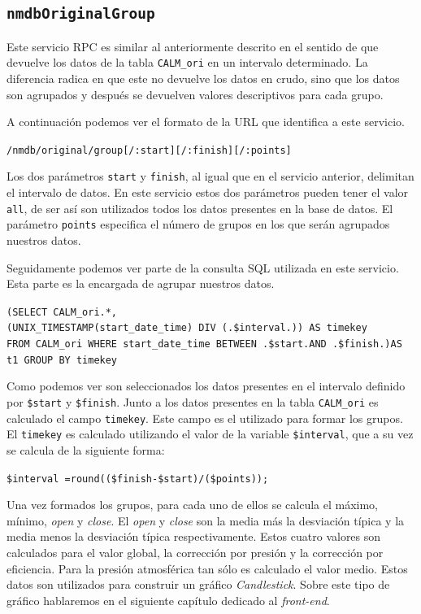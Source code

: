 	\subsection{\texttt{nmdbOriginalGroup}}
		Este servicio RPC es similar al anteriormente descrito en el sentido de que devuelve los datos de la tabla \texttt{CALM\_ori} en un
		intervalo determinado. La diferencia radica en que este no devuelve los datos en crudo, sino que los datos son agrupados y después se
		devuelven valores descriptivos para cada grupo.
		\par
		A continuación podemos ver el formato de la URL que identifica a este servicio.
			\begin{center} \texttt{/nmdb/original/group[/:start][/:finish][/:points]}  \end{center} 
		Los dos parámetros \texttt{start} y \texttt{finish}, al igual que en el servicio anterior, delimitan el intervalo de datos. En este
		servicio estos dos parámetros pueden tener el valor \texttt{all}, de ser así son utilizados todos los datos presentes en la base de
		datos. El parámetro \texttt{points} especifica el número de grupos en los que serán agrupados nuestros datos. 
		\par
		Seguidamente podemos ver parte de la consulta SQL utilizada en este servicio. Esta parte es la encargada de agrupar nuestros datos.
			\begin{center} \texttt{(SELECT CALM\_ori.*,
			  		\\	(UNIX\_TIMESTAMP(start\_date\_time) DIV (.\$interval.)) AS timekey  
				      	\\	FROM CALM\_ori WHERE start\_date\_time BETWEEN \cc.\$start.\cc AND \cc.\$finish.\cc)AS t1  GROUP BY timekey}
			\end{center} 
		Como podemos ver son seleccionados los datos presentes en el intervalo definido por \texttt{\$start} y \texttt{\$finish}. Junto a los
		datos presentes en la tabla \texttt{CALM\_ori} es calculado el campo \texttt{timekey}. Este campo es el utilizado para formar los
		grupos. El \texttt{timekey} es calculado utilizando el valor de la variable \texttt{\$interval}, que a su vez se calcula de la
		siguiente forma:
			\begin{center} \texttt{\$interval =round((\$finish-\$start)/(\$points));}  \end{center} 
		Una vez formados los grupos, para cada uno de ellos se calcula el máximo, mínimo, \emph{open} y \emph{close}. El \emph{open} y
		\emph{close} son la media más la desviación típica y la media menos la desviación típica respectivamente. Estos cuatro valores son
		calculados para el valor global, la corrección por presión y la corrección por eficiencia. Para la presión atmosférica tan sólo es
		calculado el valor medio. Estos datos son utilizados para construir un gráfico \emph{Candlestick}. Sobre este tipo de gráfico
		hablaremos en el siguiente capítulo dedicado al \emph{front-end}.
